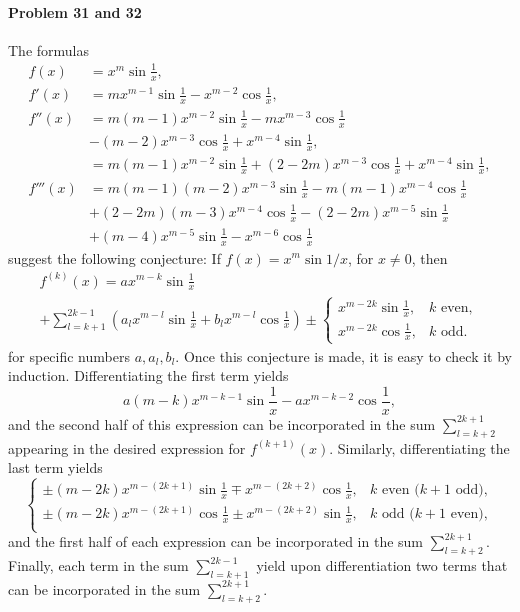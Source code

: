 \documentclass{article}
\begin{document}
\paragraph{Problem 31 and 32} The formulas \begin{align*}
  f(x) &= x^m \sin \frac{1}{x}, \\
  f'(x) &= mx^{m - 1} \sin \frac{1}{x} - x^{m - 2} \cos \frac{1}{x}, \\
  f''(x)
  &= m(m - 1)x^{m - 2} \sin \frac{1}{x} - mx^{m - 3} \cos \frac{1}{x} \\
  &- (m - 2)x^{m - 3} \cos \frac{1}{x} + x^{m - 4} \sin \frac{1}{x}, \\
  &= m(m - 1)x^{m - 2} \sin \frac{1}{x} + (2 - 2m)x^{m - 3} \cos \frac{1}{x}
  + x^{m - 4} \sin \frac{1}{x}, \\
  f'''(x) &= m(m - 1)(m - 2)x^{m - 3} \sin \frac{1}{x} - m(m - 1)x^{m - 4}
  \cos \frac{1}{x} \\
  &+ (2 - 2m)(m - 3)x^{m - 4} \cos \frac{1}{x} - (2 - 2m)x^{m - 5}
  \sin \frac{1}{x} \\
  &+ (m - 4)x^{m - 5} \sin \frac{1}{x} - x^{m - 6} \cos \frac{1}{x}
\end{align*}
suggest the following conjecture: If $f(x) = x^m \sin 1/x$, for $x \neq 0$,
then \begin{multline*}
  f^{(k)}(x) = ax^{m-k} \sin \frac{1}{x} \\
  + \sum_{l=k+1}^{2k-1}\left( a_l x^{m - l} \sin \frac{1}{x} + b_l x^{m-l}
  \cos \frac{1}{x} \right) \pm
  \begin{cases}
    x^{m-2k} \sin \frac{1}{x}, &k \text{ even}, \\
    x^{m-2k} \cos \frac{1}{x}, &k \text{ odd}.
  \end{cases}
\end{multline*} for specific numbers $a, a_l, b_l$. Once this conjecture is
made, it is easy to check it by induction. Differentiating the first term
yields \[
  a(m-k)x^{m-k-1} \sin \frac{1}{x} - ax^{m-k-2} \cos \frac{1}{x},
\] and the second half of this expression can be incorporated in the sum
$\sum_{l=k+2}^{2k+1}$ appearing in the desired expression for $f^{(k + 1)}(x)$.
Similarly, differentiating the last term yields \[
  \begin{cases}
    \pm(m - 2k)x^{m - (2k + 1)} \sin \frac{1}{x} \mp x^{m - (2k + 2)}
    \cos \frac{1}{x}, &k \text{ even (} k + 1 \text{ odd)}, \\
    \pm(m - 2k)x^{m - (2k + 1)} \cos \frac{1}{x} \pm x^{m - (2k + 2)}
    \sin \frac{1}{x}, &k \text{ odd (} k + 1 \text{ even)}, \\
  \end{cases}
\] and the first half of each expression can be incorporated in the sum
$\sum_{l=k+2}^{2k+1}$. Finally, each term in the sum $\sum_{l=k+1}^{2k-1}$
yield upon differentiation two terms that can be incorporated in the sum
$\sum_{l=k+2}^{2k+1}$.
\end{document}
